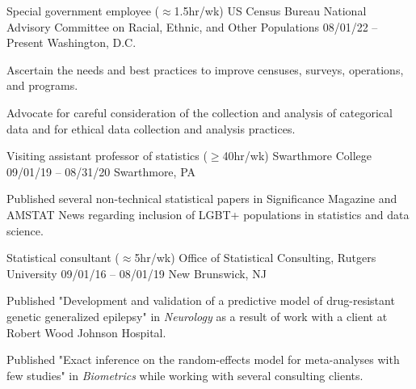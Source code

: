 \documentclass[letterpaper]{resume_config}
\begin{document}
\WorkExperience
    {Special government employee {\small ($\approx$1.5hr/wk)}} %
    {US Census Bureau National Advisory Committee on Racial, Ethnic, and Other Populations} %
    {08/01/22 -- Present} %
    {Washington, D.C.} %
    {
        \item Ascertain the needs and best practices to improve censuses, surveys, operations, and programs. 
        \item Advocate for careful consideration of the collection and analysis of categorical data and for ethical data collection and analysis practices. 
    } 


\WorkExperience
    {Visiting assistant professor of statistics {\small ($\geq$40hr/wk)}} %
    {Swarthmore College} %
    {09/01/19 -- 08/31/20} %
    {Swarthmore, PA} %
    {
        \item Published several non-technical statistical papers in Significance Magazine and AMSTAT News regarding inclusion of LGBT+ populations in statistics and data science.
    } 


\WorkExperience
    {Statistical consultant {\small ($\approx$5hr/wk)} } %
    {Office of Statistical Consulting, Rutgers University} %
    {09/01/16 -- 08/01/19} %
    {New Brunswick, NJ} %
    {
        \item Published "Development and validation of a predictive model of drug-resistant genetic generalized epilepsy" in {\it Neurology} as a result of work with a client at Robert Wood Johnson Hospital. 
        \item Published "Exact inference on the random-effects model for meta-analyses with few studies" in {\it Biometrics} while working with several consulting clients. 
    } 
\end{document}
